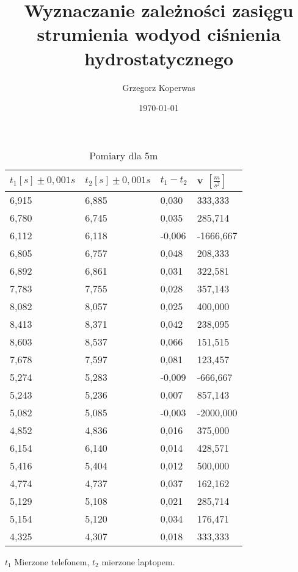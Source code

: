 \documentclass[a4paper,12pt]{article}
\title{Wyznaczanie zależności zasięgu strumienia wodyod ciśnienia hydrostatycznego}
\author{Grzegorz Koperwas}
\date{\today}
\begin{document}

\begin{table}
	\begin{tabular}{|l|l|l|l|}
		\hline
		$t_1 [s] \pm 0,001 s$	& $t_2 [s] \pm 0,001 s$ & $t_1 - t_2$ & v $\left[\frac{m}{s^2}\right]$ \\\hline\hline
6,915	& 6,885	& 0,030	& 333,333 	\\\hline
6,780	& 6,745	& 0,035	& 285,714 	\\\hline
6,112	& 6,118	& -0,006	& -1666,667 	\\\hline
6,805	& 6,757	& 0,048	& 208,333 	\\\hline
6,892	& 6,861	& 0,031	& 322,581 	\\\hline
7,783	& 7,755	& 0,028	& 357,143 	\\\hline
8,082	& 8,057	& 0,025	& 400,000 	\\\hline
8,413	& 8,371	& 0,042	& 238,095 	\\\hline
8,603	& 8,537	& 0,066	& 151,515 	\\\hline
7,678	& 7,597	& 0,081	& 123,457 	\\\hline\hline
5,274	& 5,283	& -0,009	& -666,667 	\\\hline
5,243	& 5,236	& 0,007	& 857,143 	\\\hline
5,082	& 5,085	& -0,003	& -2000,000 	\\\hline
4,852	& 4,836	& 0,016	& 375,000 	\\\hline
6,154	& 6,140	& 0,014	& 428,571 	\\\hline
5,416	& 5,404	& 0,012	& 500,000 	\\\hline
4,774	& 4,737	& 0,037	& 162,162 	\\\hline
5,129	& 5,108	& 0,021	& 285,714 	\\\hline
5,154	& 5,120	& 0,034	& 176,471 	\\\hline
4,325	& 4,307	& 0,018	& 333,333 	\\\hline
	\end{tabular}
	\centering
	\caption{Pomiary dla 5m}
\end{table}
$t_1$ Mierzone telefonem, $t_2$ mierzone laptopem.
\end{document}
